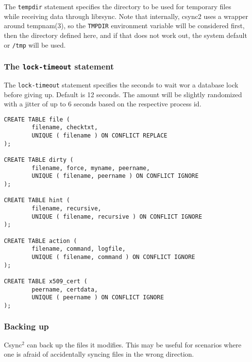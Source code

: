 \documentclass[a4paper,twocolumn]{article}
\def\csync2{{\sc Csync$^{2}$}}
\begin{document}
The {\tt tempdir} statement specifies the directory to be used for temporary
files while receiving data through librsync. Note that internally, csync2 uses
a wrapper around tempnam(3), so the {\tt TMPDIR} environment variable will be
considered first, then the directory defined here, and if that does not work out,
the system default or {\tt /tmp} will be used.

\subsubsection{The {\tt lock-timeout} statement}

The {\tt lock-timeout} statement specifies the seconds to wait wor a database lock
before giving up. Default is 12 seconds. The amount will be slightly randomized
with a jitter of up to 6 seconds based on the respective process id.


\begin{figure*}[t]
  \begin{center}
\begin{verbatim}
CREATE TABLE file (
        filename, checktxt,
        UNIQUE ( filename ) ON CONFLICT REPLACE
);

CREATE TABLE dirty (
        filename, force, myname, peername,
        UNIQUE ( filename, peername ) ON CONFLICT IGNORE
);

CREATE TABLE hint (
        filename, recursive,
        UNIQUE ( filename, recursive ) ON CONFLICT IGNORE
);

CREATE TABLE action (
        filename, command, logfile,
        UNIQUE ( filename, command ) ON CONFLICT IGNORE
);

CREATE TABLE x509_cert (
        peername, certdata,
        UNIQUE ( peername ) ON CONFLICT IGNORE
);
\end{verbatim}
  \end{center}
  \caption{The \csync2 database schema}
\end{figure*}


\subsubsection{Backing up}

\csync2 can back up the files it modifies. This may be useful for scenarios
where one is afraid of accidentally syncing files in the wrong direction.
\end{document}
